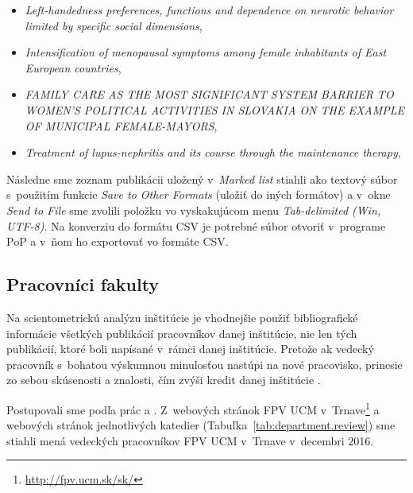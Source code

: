 \begin{itemize}
\item \emph{Left-handedness preferences, functions and dependence on neurotic
    behavior limited by specific social dimensions},
\item \emph{Intensification of menopausal symptoms among female inhabitants of
    East European countries},
\item \emph{FAMILY CARE AS THE MOST SIGNIFICANT SYSTEM BARRIER TO WOMEN'S
    POLITICAL ACTIVITIES IN SLOVAKIA ON THE EXAMPLE OF MUNICIPAL FEMALE-MAYORS},
\item \emph{Treatment of lupus-nephritis and its course through the maintenance
    therapy},
\end{itemize}

Následne sme zoznam publikácii uložený v~\emph{Marked list} stiahli ako textový
súbor s~použitím funkcie \emph{Save to Other Formats} (uložiť do iných formátov)
a v~okne \emph{Send to File} sme zvolili položku vo vyskakujúcom menu
\emph{Tab-delimited (Win, UTF-8)}.  Na konverziu do formátu CSV je potrebné
súbor otvoriť v~programe PoP \citep{Harzing2011} a v~ňom ho exportovať vo
formáte CSV.


\subsection{Pracovníci fakulty}
\label{sec:staff.mining}

Na scientometrickú analýzu inštitúcie je vhodnejšie použiť bibliografické
informácie všetkých publikácií pracovníkov danej inštitúcie, nie len tých
publikácií, ktoré boli napísané v~rámci danej inštitúcie.  Pretože ak vedecký
pracovník s~bohatou výskumnou minulosťou nastúpi na nové pracovisko, prinesie zo
sebou skúsenosti a znalosti, čím zvýši kredit danej inštitúcie
\citep{Altanopoulou2012}.

Postupovali sme podľa prác \citet{Kazakis2014a} a
\citet{Kazakis2014b,Kazakis2015}.  Z~webových stránok FPV UCM
v~Trnave\footnote{\url{http://fpv.ucm.sk/sk/}} a webových stránok jednotlivých
katedier (Tabuľka~\ref{tab:department.review}) sme stiahli mená vedeckých
pracovníkov FPV UCM v~Trnave v~decembri 2016.

